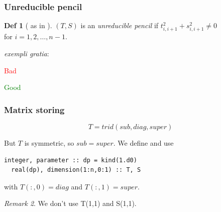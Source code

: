 \documentclass{beamer}
\theoremstyle{definition} \newtheorem{de}{Def}
\theoremstyle{remark} \newtheorem{os}[de]{Remark}
\theoremstyle{plain} \newtheorem{te}[de]{Teo}
\theoremstyle{plain} \newtheorem{co}[de]{Cor}
\theoremstyle{plain} \newtheorem{pr}[de]{Prop}
\theoremstyle{plain} \newtheorem{lem}[de]{Lemm}
\theoremstyle{remark} \newtheorem{rem}[de]{Remark}
\begin{document}
\begin{frame}
\frametitle{Unreducible pencil}

\begin{de}[ as in \cite{principal} ]
  $(T,S)$ is an \emph{unreducible pencil} if $t_{i,i+1}^2 + 
s_{i,i+1}^2 \neq 0$\\
  for $i=1,2,\dots,n-1$.
\end{de}

\pause

\emph{exempli gratia}:

\begin{Bdescription}
  \item [\textcolor{red}{Bad}]
  
  \item [\textcolor{green}{Good}]
\end{Bdescription}

\end{frame}

\begin{frame}[fragile]
\frametitle{Matrix storing}

\begin{equation*}
  T = trid(sub,diag,super)
\end{equation*}

But $T$ is symmetric, so $sub=super$. We define and use

\begin{lstlisting}[style=fortranSlide, caption={$T,S$ as couple of array}]
  integer, parameter :: dp = kind(1.d0)
  real(dp), dimension(1:n,0:1) :: T, S  
\end{lstlisting}

with $T(:,0)=diag$ and $T(:,1)=super$.

\begin{os}
  We don't use T(1,1) and S(1,1). 
\end{os}

\end{frame}
\end{document}
